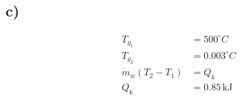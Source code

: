 

\subsection*{c)}
\begin{align*}
    T_{g_1} &= 500^\circ C \\
    T_{g_2} &= 0.003^\circ C \\
    \dot{m}_w (T_{2} - T_{1}) &= Q_k \\
    Q_k &= 0.85 \, \text{kJ}
\end{align*}